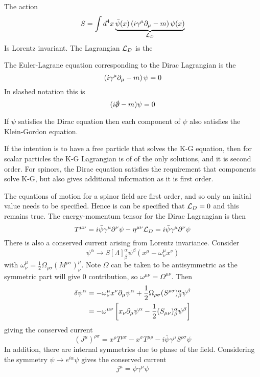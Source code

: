\documentclass{article}
\begin{document}
\begin{definition}
The action
\[
S=\int d^{4}x \underbrace{\bar{\psi}(x)\left(i\gamma^\mu\partial_\mu-m\right)\psi(x)}_{\mathcal{L}_D}
\]
Is Lorentz invariant. The Lagrangian $\mathcal{L}_D$ is the 
\end{definition}

\begin{definition}
The Euler-Lagrane equation corresponding to the Dirac Lagrangian is the 
\[
\left(i\gamma^\mu\partial_\mu-m\right)\psi=0
\]
In slashed notation this is 
\[
(i \slashed{\del}-m)\psi=0
\]
\end{definition}

\begin{theorem}
If $\psi$ satisfies the Dirac equation then each component of $\psi$ also satisfies the Klein-Gordon equation. 
\end{theorem}

\begin{idea}
If the intention is to have a free particle that solves the K-G equation, then for scalar particles the K-G Lagrangian is of of the only solutions, and it is second order. For spinors, the Dirac equation satisfies the requirement that components solve K-G, but also gives additional information as it is first order. 
\end{idea}

\begin{example}
The equations of motion for a spinor field are first order, and so only an initial value needs to be specified. Hence is can be specified that $\mathcal{L}_D=0$ and this remains true. 
The energy-momentum tensor for the Dirac Lagrangian is then  
\[
T^{\mu\nu} = i\bar{\psi}\gamma^\mu\partial^\nu\psi-\eta^{\mu\nu}\mathcal{L}_D = i\bar{\psi}\gamma^\mu\partial^\nu\psi
\]
There is also a conserved current arising from Lorentz invariance. Consider 
\[
\psi^\alpha \to S[\Lambda]^\alpha_\beta \psi^\beta (x^\mu-\omega^\mu_\nu x^\nu )
\]
with $\omega^\mu_\nu = \frac{1}{2} \Omega_{\rho\sigma}(M^{\rho\sigma})^\mu_\nu$. Note $\Omega$ can be taken to be antisymmetric as the symmetric part will give $0$ contribution, so $\omega^{\mu\nu}=\Omega^{\mu\nu}$. Then 
\begin{align*}
\delta \psi^\alpha &= -\omega^\mu_\nu x^\nu \partial_\mu \psi^\alpha + \frac{1}{2}\Omega_{\rho\sigma}(S^{\rho\sigma})^\alpha_\beta \psi^\beta \\
&= -\omega^{\mu\nu} \left[ x_\nu \partial_\mu \psi^\alpha -\frac{1}{2} (S_{\mu\nu})^\alpha_\beta \psi^\beta \right]
\end{align*}
giving the conserved current
\[
(J^\mu)^{\rho\sigma}=x^\rho T^{\mu\sigma}-x^\sigma T^{\mu\rho}-i\bar{\psi} \gamma^\mu S^{\rho\sigma} \psi
\]
In addition, there are internal symmetries due to phase of the field. Considering the symmetry $\psi \to e^{i\alpha} \psi$ gives the conserved current 
\[
j^\mu = \bar{\psi} \gamma^\mu \psi
\]
\end{example}
\end{document}

